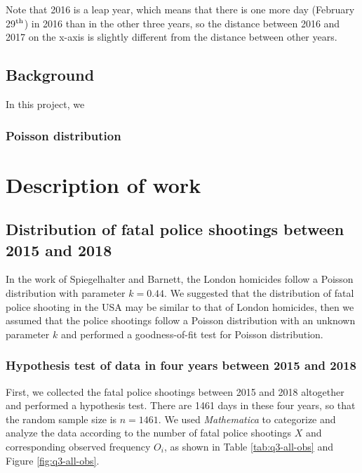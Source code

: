 \documentclass[conf]{new-aiaa}
\begin{document}
Note that 2016 is a leap year, which means that there is one more day (February 29$^{\rm th}$) in 2016 than in the other three years, so the distance between 2016 and 2017 on the x-axis is slightly different from the distance between other years.

\subsection{Background}

In this project, we 

\subsubsection{Poisson distribution}
\label{title:poisson}

\newpage

\section{Description of work}

\subsection{Distribution of fatal police shootings between 2015 and 2018}

In the work of Spiegelhalter and Barnett\cite{}, the London homicides follow a Poisson distribution with parameter $k = 0.44$. We suggested that the distribution of fatal police shooting in the USA may be similar to that of London homicides, then we assumed that the police shootings follow a Poisson distribution with an unknown parameter $k$ and performed a goodness-of-fit test for Poisson distribution.

\subsubsection{Hypothesis test of data in four years between 2015 and 2018}\label{title:q3-1}

First, we collected the fatal police shootings between 2015 and 2018 altogether and performed a hypothesis test. There are 1461 days in these four years, so that the random sample size is $n=1461$. We used \emph{Mathematica} to categorize and analyze the data according to the number of fatal police shootings $X$ and corresponding observed frequency $O_i$, as shown in Table \ref{tab:q3-all-obs} and Figure \ref{fig:q3-all-obs}. \medskip
\end{document}
